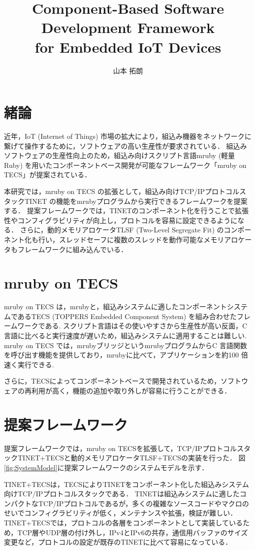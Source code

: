 \documentclass[a4j,10pt,twocolumn]{../styles/utf8/abstract}
\title{Component-Based Software Development Framework\\for Embedded IoT Devices}	%
\author{山本 拓朗} 		%
\begin{document}
\absttitle 		%

\section{緒論}

近年，IoT (Internet of Things) 市場の拡大により，組込み機器をネットワークに繋げて操作するために，ソフトウェアの高い生産性が要求されている．
組込みソフトウェアの生産性向上のため，組込み向けスクリプト言語mruby (軽量Ruby) を用いたコンポーネントベース開発が可能なフレームワーク「mruby on TECS」\cite{par:mrubyonTECS}が提案されている．

本研究では，mruby on TECS の拡張として，組込み向けTCP/IPプロトコルスタックTINET の機能をmrubyプログラムから実行できるフレームワークを提案する．
提案フレームワークでは，TINETのコンポーネント化を行うことで拡張性やコンフィグラビリティが向上し，プロトコルを容易に設定できるようになる．
さらに，動的メモリアロケータTLSF (Two-Level Segregate Fit) のコンポーネント化も行い，スレッドセーフに複数のスレッドを動作可能なメモリアロケータもフレームワークに組み込んでいる．

\section{mruby on TECS}

mruby on TECS は，mrubyと，組込みシステムに適したコンポーネントシステムであるTECS (TOPPERS Embedded Component System) を組み合わせたフレームワークである.
スクリプト言語はその使いやすさから生産性が高い反面，C 言語に比べると実行速度が遅いため，組込みシステムに適用することは難しい.
mruby on TECS では，mrubyブリッジというmrubyプログラムからC 言語関数を呼び出す機能を提供しており，mrubyに比べて，アプリケーションを約100 倍速く実行できる.

さらに，TECSによってコンポーネントベースで開発されているため，ソフトウェアの再利用が高く，機能の追加や取り外しが容易に行うことができる．

\section{提案フレームワーク}

提案フレームワークでは，mruby on TECSを拡張して，TCP/IPプロトコルスタックTINET+TECSと動的メモリアロケータTLSF+TECSの実装を行った．
図\ref{fig:SystemModel}に提案フレームワークのシステムモデルを示す．

TINET+TECSは，TECSによりTINETをコンポーネント化した組込みシステム向けTCP/IPプロトコルスタックである．
TINETは組込みシステムに適したコンパクトなTCP/IPプロトコルであるが，多くの複雑なソースコードやマクロのせいでコンフィグラビリティが低く，メンテナンスや拡張，検証が難しい．
TINET+TECSでは，プロトコルの各層をコンポーネントとして実装しているため，TCP層やUDP層の付け外し，IPv4とIPv6の共存，通信用バッファのサイズ変更など，プロトコルの設定が既存のTINETに比べて容易になっている．
\end{document}
